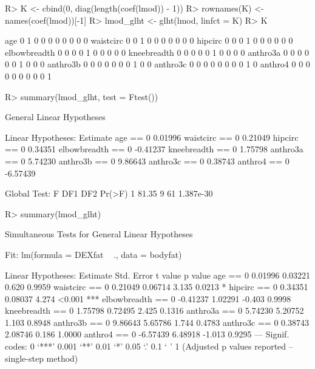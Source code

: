 \documentclass[landscape]{slides}
\begin{document}
\begin{Schunk}
\begin{Sinput}
R> K <- cbind(0, diag(length(coef(lmod)) - 1))
R> rownames(K) <- names(coef(lmod))[-1]
R> lmod_glht <- glht(lmod, linfct = K) 
R> K
\end{Sinput}
\begin{Soutput}
             [,1] [,2] [,3] [,4] [,5] [,6] [,7] [,8] [,9] [,10]
age             0    1    0    0    0    0    0    0    0     0
waistcirc       0    0    1    0    0    0    0    0    0     0
hipcirc         0    0    0    1    0    0    0    0    0     0
elbowbreadth    0    0    0    0    1    0    0    0    0     0
kneebreadth     0    0    0    0    0    1    0    0    0     0
anthro3a        0    0    0    0    0    0    1    0    0     0
anthro3b        0    0    0    0    0    0    0    1    0     0
anthro3c        0    0    0    0    0    0    0    0    1     0
anthro4         0    0    0    0    0    0    0    0    0     1
\end{Soutput}
\end{Schunk}


\begin{Schunk}
\begin{Sinput}
R> summary(lmod_glht, test = Ftest())
\end{Sinput}
\begin{Soutput}
	 General Linear Hypotheses

Linear Hypotheses:
                  Estimate
age == 0           0.01996
waistcirc == 0     0.21049
hipcirc == 0       0.34351
elbowbreadth == 0 -0.41237
kneebreadth == 0   1.75798
anthro3a == 0      5.74230
anthro3b == 0      9.86643
anthro3c == 0      0.38743
anthro4 == 0      -6.57439

Global Test:
      F DF1 DF2    Pr(>F)
1 81.35   9  61 1.387e-30
\end{Soutput}
\end{Schunk}

\begin{Schunk}
\begin{Sinput}
R> summary(lmod_glht)
\end{Sinput}
\begin{Soutput}
	 Simultaneous Tests for General Linear Hypotheses

Fit: lm(formula = DEXfat ~ ., data = bodyfat)

Linear Hypotheses:
                  Estimate Std. Error t value p value    
age == 0           0.01996    0.03221   0.620  0.9959    
waistcirc == 0     0.21049    0.06714   3.135  0.0213 *  
hipcirc == 0       0.34351    0.08037   4.274  <0.001 ***
elbowbreadth == 0 -0.41237    1.02291  -0.403  0.9998    
kneebreadth == 0   1.75798    0.72495   2.425  0.1316    
anthro3a == 0      5.74230    5.20752   1.103  0.8948    
anthro3b == 0      9.86643    5.65786   1.744  0.4783    
anthro3c == 0      0.38743    2.08746   0.186  1.0000    
anthro4 == 0      -6.57439    6.48918  -1.013  0.9295    
---
Signif. codes:  0 ‘***’ 0.001 ‘**’ 0.01 ‘*’ 0.05 ‘.’ 0.1 ‘ ’ 1 
(Adjusted p values reported -- single-step method)
\end{Soutput}
\end{Schunk}
\end{document}
